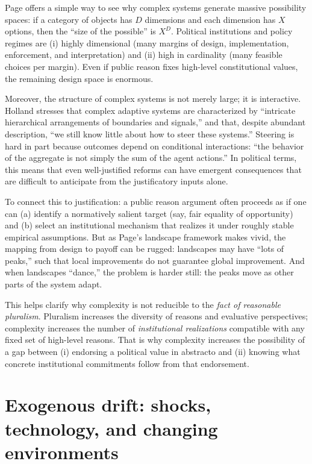 \documentclass[12pt]{report}
\begin{document}
Page offers a simple way to see why complex systems generate massive possibility spaces: if a category of objects has $D$ dimensions and each dimension has $X$ options, then the “size of the possible” is $X^{D}$. \parencite[p.~130]{page2011diversity} Political institutions and policy regimes are (i) highly dimensional (many margins of design, implementation, enforcement, and interpretation) and (ii) high in cardinality (many feasible choices per margin). Even if public reason fixes high-level constitutional values, the remaining design space is enormous.

Moreover, the structure of complex systems is not merely large; it is interactive. Holland stresses that complex adaptive systems are characterized by “intricate hierarchical arrangements of boundaries and signals,” and that, despite abundant description, “we still know little about how to steer these systems.” \parencite[p.~1]{holland2012signals} Steering is hard in part because outcomes depend on conditional interactions: “the behavior of the aggregate is not simply the sum of the agent actions.” \parencite[p.~2]{holland2012signals} In political terms, this means that even well-justified reforms can have emergent consequences that are difficult to anticipate from the justificatory inputs alone.

To connect this to justification: a public reason argument often proceeds as if one can (a) identify a normatively salient target (say, fair equality of opportunity) and (b) select an institutional mechanism that realizes it under roughly stable empirical assumptions. But as Page’s landscape framework makes vivid, the mapping from design to payoff can be rugged: landscapes may have “lots of peaks,” such that local improvements do not guarantee global improvement. \parencite[p.~98]{page2011diversity} And when landscapes “dance,” the problem is harder still: the peaks move as other parts of the system adapt. \parencite[p.~94]{page2011diversity}

This helps clarify why complexity is not reducible to the \emph{fact of reasonable pluralism}. Pluralism increases the diversity of reasons and evaluative perspectives; complexity increases the number of \emph{institutional realizations} compatible with any fixed set of high-level reasons. That is why complexity increases the possibility of a gap between (i) endorsing a political value in abstracto and (ii) knowing what concrete institutional commitments follow from that endorsement.

\section{Exogenous drift: shocks, technology, and changing environments}
\end{document}
